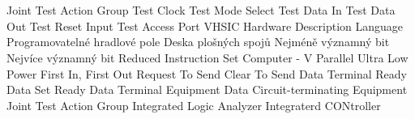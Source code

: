 \cleardoublepage
\chapter*{\listofabbrevname}
{}

\begin{acronym}[KolikMista]

		{Joint Test Action Group}
		{Test Clock}
		{Test Mode Select}
		{Test Data In}
		{Test Data Out}
		{Test Reset Input}
		{Test Access Port}
		{VHSIC Hardware Description Language}
		{Programovatelné hradlové pole}
		{Deska plošných spojů}
		{Nejméně významný bit}
		{Nejvíce významný bit}
		{Reduced Instruction Set Computer - V}
		{Parallel Ultra Low Power}
		{First In, First Out}
		{Request To Send}
		{Clear To Send}
		{Data Terminal Ready}
		{Data Set Ready}
		{Data Terminal Equipment}
		{Data Circuit-terminating Equipment}
		{Joint Test Action Group}
		{Integrated Logic Analyzer}
		{Integraterd CONtroller}
		
\end{acronym}
